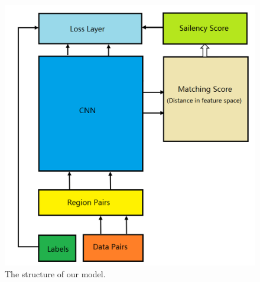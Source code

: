 \begin{figure}[htbp]
\includegraphics[width=0.9\linewidth]{img/structure}
\caption{The structure of our model.}
\label{fig:network}
\end{figure}

